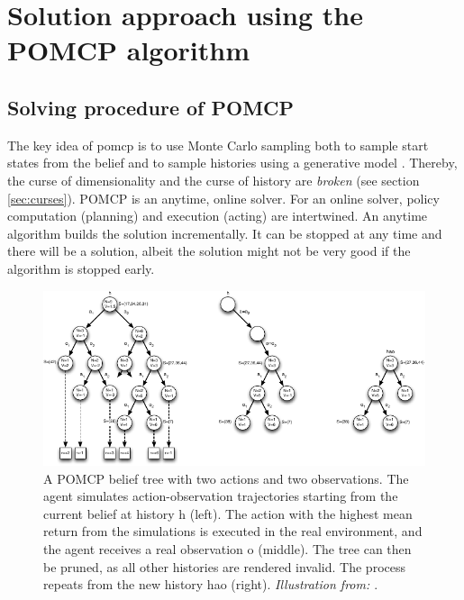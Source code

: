 \section{Solution approach using the POMCP algorithm}

\subsection{Solving procedure of POMCP}
\label{sec:pomcp}

The key idea of \acrfull{pomcp} is to use Monte Carlo sampling both to sample start states from the belief and to sample histories using a generative model \parencite{pomcp}. Thereby, the curse of dimensionality and the curse of history are \emph{broken} (see section \ref{sec:curses}). POMCP is an anytime, online solver. For an online solver, policy computation (planning) and execution (acting) are intertwined. An anytime algorithm builds the solution incrementally. It can be stopped at any time and there will be a solution, albeit the solution might not be very good if the algorithm is stopped early.

\begin{figure}[htbp]
    \centering
    \includegraphics[width=1.0\textwidth]{figures/POMCP_original.pdf}
    \caption[A POMCP belief tree]{A POMCP belief tree with two actions and two observations. The agent simulates action-observation trajectories starting from the current belief at history h (left). The action with the highest mean return from the simulations is executed in the real environment, and the agent receives a real observation o (middle). The tree can then be pruned, as all other histories are rendered invalid. The process repeats from the new history hao (right). \emph{Illustration from: \cite{pomcp}}.}
    \label{fig:pomcp_original}
\end{figure}


